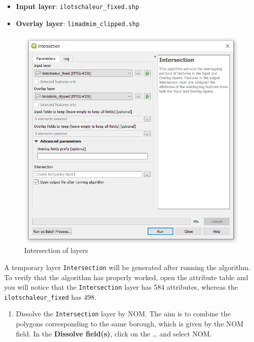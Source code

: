 \documentclass[]{book}
\providecommand{\tightlist}{%
  \setlength{\itemsep}{0pt}\setlength{\parskip}{0pt}}
\theoremstyle{definition}
\theoremstyle{definition}
\theoremstyle{definition}
\theoremstyle{remark}
\begin{document}
\begin{itemize}
\tightlist
\item
  \textbf{Input layer}: \texttt{ilotschaleur\_fixed.shp}
\item
  \textbf{Overlay layer}: \texttt{limadmim\_clipped.shp}
\end{itemize}

\begin{figure}

{\centering \includegraphics[width=10.53in]{figures/Intersection_UHA_Fixed} 

}

\caption{Intersection of layers}\label{fig:unnamed-chunk-31}
\end{figure}

A temporary layer \texttt{Intersection} will be generated after running
the algorithm. To verify that the algorithm has properly worked, open
the attribute table and you will notice that the \texttt{Intersection}
layer has 584 attributes, whereas the \texttt{ilotschaleur\_fixed} has
498.

\begin{enumerate}
\def\labelenumi{\arabic{enumi}.}
\setcounter{enumi}{5}
\tightlist
\item
  Dissolve the \texttt{Intersection} layer by NOM. The aim is to combine
  the polygons corresponding to the same borough, which is given by the
  NOM field. In the \textbf{Dissolve field(s)}, click on the \ldots{}
  and select NOM.
\end{enumerate}
\end{document}
